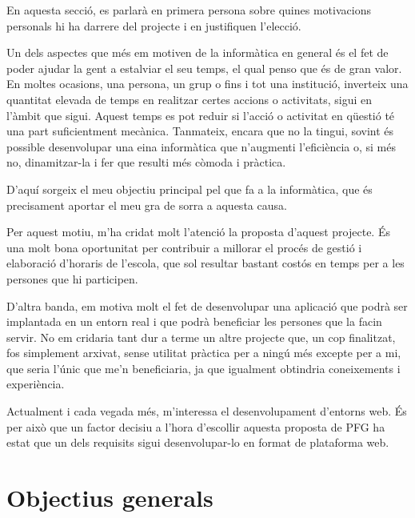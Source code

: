 \documentclass[a4paper,12pt]{ThesisStyle}
\begin{document}
En aquesta secció, es parlarà en primera persona sobre quines motivacions personals hi ha darrere del projecte i en justifiquen l'elecció.

Un dels aspectes que més em motiven de la informàtica en general és el fet de poder ajudar la gent a estalviar el seu temps, el qual penso que és de gran valor. En moltes ocasions, una persona, un grup o fins i tot una institució, inverteix una quantitat elevada de temps en realitzar certes accions o activitats, sigui en l'àmbit que sigui. Aquest temps es pot reduir si l'acció o activitat en qüestió té una part suficientment mecànica. Tanmateix, encara que no la tingui, sovint és possible desenvolupar una eina informàtica que n'augmenti l'eficiència o, si més no, dinamitzar-la i fer que resulti més còmoda i pràctica.

D'aquí sorgeix el meu objectiu principal pel que fa a la informàtica, que és precisament aportar el meu gra de sorra a aquesta causa.

Per aquest motiu, m'ha cridat molt l'atenció la proposta d'aquest projecte. És una molt bona oportunitat per contribuir a millorar el procés de gestió i elaboració d'horaris de l'escola, que sol resultar bastant costós en temps per a les persones que hi participen.

D'altra banda, em motiva molt el fet de desenvolupar una aplicació que podrà ser implantada en un entorn real i que podrà beneficiar les persones que la facin servir. No em cridaria tant dur a terme un altre projecte que, un cop finalitzat, fos simplement arxivat, sense utilitat pràctica per a ningú més excepte per a mi, que seria l'únic que me'n beneficiaria, ja que igualment obtindria coneixements i experiència.

Actualment i cada vegada més, m'interessa el desenvolupament d'entorns web. És per això que un factor decisiu a l'hora d'escollir aquesta proposta de PFG ha estat que un dels requisits sigui desenvolupar-lo en format de plataforma web.

\section{Objectius generals}
\label{sec:objectius_generals}
\end{document}
